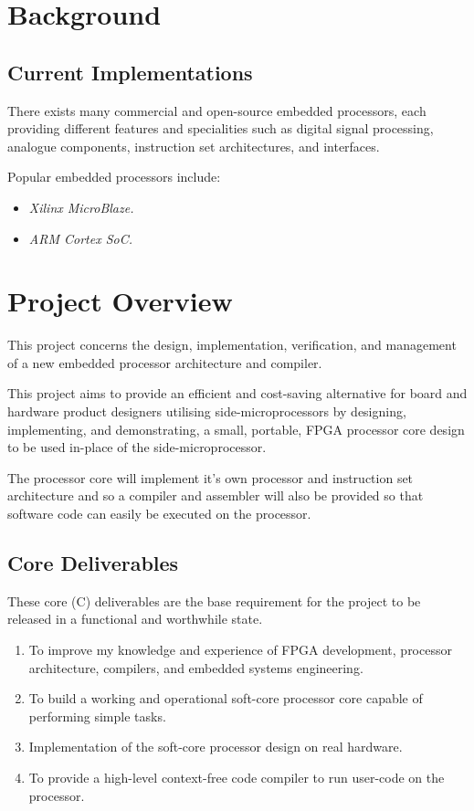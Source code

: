 \documentclass[11pt,a4paper]{report}
\begin{document}

\section{Background}
\subsection{Current Implementations}
There exists many commercial and open-source embedded processors, each providing different features and specialities such as digital signal processing, analogue components, instruction set architectures, and interfaces.

Popular embedded processors include:
\begin{itemize}
\item{\textit{Xilinx MicroBlaze.}}
\item{\textit{ARM Cortex SoC.}}
\end{itemize}

\newpage

\section{Project Overview}
This project concerns the design, implementation, verification, and management of a new embedded processor architecture and compiler.

This project aims to provide an efficient and cost-saving alternative for board and hardware product designers utilising side-microprocessors by designing, implementing, and demonstrating, a small, portable, FPGA processor core design to be used in-place of the side-microprocessor. 

The processor core will implement it's own processor and instruction set architecture and so a compiler and assembler will also be provided so that software code can easily be executed on the processor.

\subsection{Core Deliverables}
These core (C) deliverables are the base requirement for the project to be released in a functional and worthwhile state.
\begin{enumerate}[label=\bfseries C\arabic*.]
\item{To improve my knowledge and experience of FPGA development, processor architecture, compilers, and embedded systems engineering.}
\item{To build a working and operational soft-core processor core capable of performing simple tasks.}
\item{Implementation of the soft-core processor design on real hardware.}
\item{To provide a high-level context-free code compiler to run user-code on the processor.}
\end{enumerate}
\end{document}

